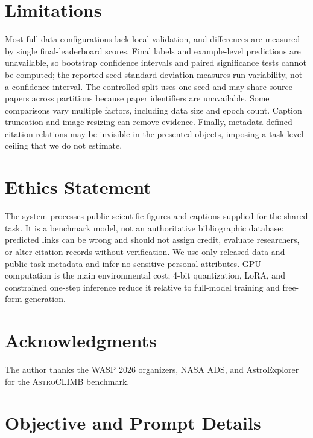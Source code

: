 \documentclass[11pt]{article}
\newcommand{\task}{\textsc{AstroCLIMB}}
\begin{document}
\section*{Limitations}

Most full-data configurations lack local validation, and differences are measured by single final-leaderboard scores.  Final labels and example-level predictions are unavailable, so bootstrap confidence intervals and paired significance tests cannot be computed; the reported seed standard deviation measures run variability, not a confidence interval.  The controlled split uses one seed and may share source papers across partitions because paper identifiers are unavailable.  Some comparisons vary multiple factors, including data size and epoch count.  Caption truncation and image resizing can remove evidence.  Finally, metadata-defined citation relations may be invisible in the presented objects, imposing a task-level ceiling that we do not estimate.

\section*{Ethics Statement}

The system processes public scientific figures and captions supplied for the shared task.  It is a benchmark model, not an authoritative bibliographic database: predicted links can be wrong and should not assign credit, evaluate researchers, or alter citation records without verification.  We use only released data and public task metadata and infer no sensitive personal attributes.  GPU computation is the main environmental cost; 4-bit quantization, LoRA, and constrained one-step inference reduce it relative to full-model training and free-form generation.

\section*{Acknowledgments}

The author thanks the WASP 2026 organizers, NASA ADS, and AstroExplorer for the \task{} benchmark.

\clearpage


\clearpage
\appendix

\section{Objective and Prompt Details}
\label{sec:objective-details}
\end{document}
